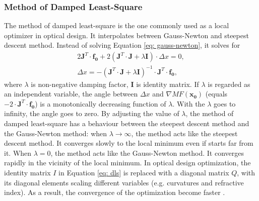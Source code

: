 \subsubsection{Method of Damped Least-Square}

The method of damped least-square is the one commonly used as a local optimizer in optical design. It interpolates between Gauss-Newton and steepest descent method.  
Instead of solving Equation \ref{eq: gauss-newton}, it solves for 
\begin{equation} \label{eq: dls}
\begin{split}
2 \pmb{J}^{T} \cdot \pmb{f_0} + 2(\pmb{J}^T \cdot \pmb{J} + \lambda \pmb{I} )\cdot \Delta x = 0 , \\
\Delta x = - (\pmb{J}^T \cdot \pmb{J} + \lambda \pmb{I} )^{-1} \cdot \pmb{J}^{T} \cdot \pmb{f_0},
\end{split}
\end{equation}where $\lambda$ is non-negative damping factor, $\pmb{I}$ is identity matrix. If $\lambda$ is regarded as an independent variable, the angle between $\Delta x$ and $\nabla MF(\pmb{x_0}) $ (equals $-2 \cdot \pmb{J}^{T} \cdot \pmb{f_0}$) is a monotonically decreasing function of $\lambda$. With the $\lambda$ goes to infinity, the angle goes to zero. By adjusting the value of $\lambda$, the method of damped least-square has a behaviour between the steepest descent method and the Gauss-Newton method: when $\lambda \rightarrow \infty $, the method acts like the steepest descent method. It converges slowly to the local minimum even if starts far from it. When $\lambda = 0$, the method acts like the Gauss-Newton method. It converges rapidly in the vicinity of the local minimum. 
In optical design optimization, the identity matrix $I$ in Equation \ref{eq: dls} is replaced with a diagonal matrix $Q$, with its diagonal elements scaling different variables (e.g. curvatures and refractive index). As a result, the convergence of the optimization become faster \cite{Meiron:65_dls}.

